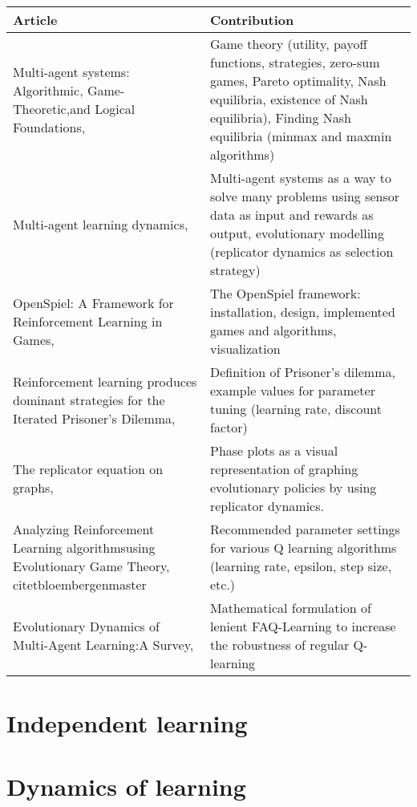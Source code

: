 \documentclass[10pt,a4paper]{article}
\begin{document}
\bigskip
\begin{tabular}{|p{4cm}|p{9cm}|}
\hline 
Article & Contribution \\ 
\hline 
\hline
Multi-agent systems: Algorithmic, Game-Theoretic,and Logical Foundations, \citet{mas} & Game theory  (utility, payoff functions, strategies, zero-sum games, Pareto optimality, Nash equilibria, existence of Nash equilibria), Finding Nash equilibria (minmax and maxmin algorithms)  \\ 
\hline 
Multi-agent learning dynamics, \citet{phdthesis} &  Multi-agent systems as a way to solve many problems using sensor data as input and rewards as output, evolutionary modelling (replicator dynamics as selection strategy) \\
\hline 
OpenSpiel: A Framework for Reinforcement Learning in Games, \citet{lanctot2019openspiel} & The OpenSpiel framework: installation, design, implemented games and algorithms, visualization \\ 
\hline 
Reinforcement learning produces dominant strategies for the Iterated Prisoner’s Dilemma, \citet{rlforpd} & Definition of Prisoner's dilemma, example values for parameter tuning (learning rate, discount factor) \\ 
\hline 
The replicator equation on graphs, \citet{Ohtsuki2006TheRE} & Phase plots as a visual representation of graphing evolutionary policies by using replicator dynamics. \\
\hline
Analyzing Reinforcement Learning algorithmsusing Evolutionary Game Theory, citet{bloembergenmaster} & Recommended parameter settings for various Q learning algorithms (learning rate, epsilon, step size, etc.) \\
\hline
Evolutionary Dynamics of Multi-Agent Learning:A Survey, \citet{evoldynamics} & Mathematical formulation of lenient FAQ-Learning to increase the robustness of regular Q-learning \\
\end{tabular} 

\section{Independent learning}
\section{Dynamics of learning}


{}

\end{document}
